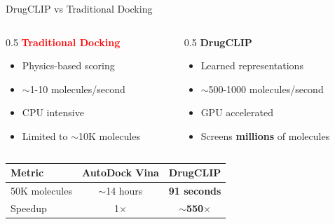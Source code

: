 \documentclass[aspectratio=169,xcolor=table]{beamer}
\begin{document}
\begin{frame}{DrugCLIP vs Traditional Docking}
\begin{columns}
\begin{column}{0.5\textwidth}
\textbf{\textcolor{red}{Traditional Docking}}
\begin{itemize}\setlength{\itemsep}{0pt}
    \item Physics-based scoring
    \item $\sim$1-10 molecules/second
    \item CPU intensive
    \item Limited to $\sim$10K molecules
\end{itemize}
\end{column}

\begin{column}{0.5\textwidth}
\textbf{\textcolor{druggreen}{DrugCLIP}}
\begin{itemize}\setlength{\itemsep}{0pt}
    \item Learned representations
    \item $\sim$500-1000 molecules/second
    \item GPU accelerated
    \item Screens \textbf{millions} of molecules
\end{itemize}
\end{column}
\end{columns}

\vspace{0.3cm}
\centering
\begin{tabular}{lcc}
\toprule
\textbf{Metric} & \textbf{AutoDock Vina} & \textbf{DrugCLIP} \\
\midrule
50K molecules & $\sim$14 hours & \textbf{91 seconds} \\
Speedup & 1$\times$ & \textbf{$\sim$550$\times$} \\
\bottomrule
\end{tabular}
\end{frame}
\end{document}
